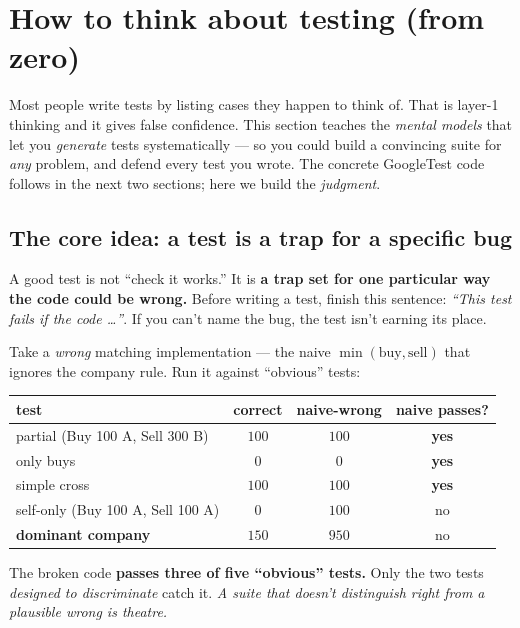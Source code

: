 \section{How to think about testing (from zero)}

Most people write tests by listing cases they happen to think of. That is layer-1
thinking and it gives false confidence. This section teaches the \emph{mental
models} that let you \emph{generate} tests systematically --- so you could build a
convincing suite for \emph{any} problem, and defend every test you wrote. The
concrete GoogleTest code follows in the next two sections; here we build the
\emph{judgment}.

\subsection{The core idea: a test is a trap for a specific bug}

A good test is not ``check it works.'' It is \textbf{a trap set for one particular
way the code could be wrong.} Before writing a test, finish this sentence:
\emph{``This test fails if the code \dots''}. If you can't name the bug, the test
isn't earning its place.

\begin{keybox}
Take a \emph{wrong} matching implementation --- the naive $\min(\text{buy},\text{sell})$
that ignores the company rule. Run it against ``obvious'' tests:
\begin{center}\footnotesize
\begin{tabular}{@{}lccc@{}}
\toprule
test & correct & naive-wrong & naive passes? \\
\midrule
partial (Buy 100 A, Sell 300 B) & $100$ & $100$ & \textcolor{Sell}{\textbf{yes}} \\
only buys & $0$ & $0$ & \textcolor{Sell}{\textbf{yes}} \\
simple cross & $100$ & $100$ & \textcolor{Sell}{\textbf{yes}} \\
self-only (Buy 100 A, Sell 100 A) & $0$ & $100$ & \textcolor{Buy}{no} \\
\textbf{dominant company} & $150$ & $950$ & \textcolor{Buy}{no} \\
\bottomrule
\end{tabular}
\end{center}
The broken code \textbf{passes three of five ``obvious'' tests.} Only the two tests
\emph{designed to discriminate} catch it. \emph{A suite that doesn't distinguish
right from a plausible wrong is theatre.}
\end{keybox}

